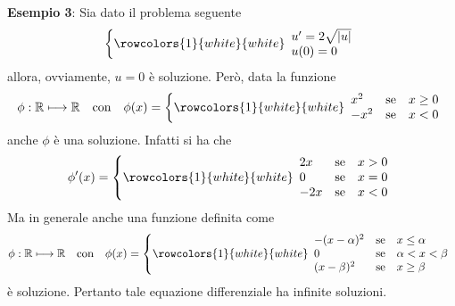 \documentclass[a4paper]{extarticle}
\begin{document}
\vspace{2em}
\noindent
\textbf{Esempio 3}: Sia dato il problema seguente
\[
    \left\{
        \rowcolors{1}{white}{white}
        \begin{array}{lll}
            u'=2\sqrt{\vert u \vert}\\
            u(0)=0
        \end{array}
    \right.
\]
allora, ovviamente, $u=0$ è soluzione. Però, data la funzione
\[\phi : \mathbb{R} \longmapsto \mathbb{R} \hspace{1em} \text{con} \hspace{1em} \phi(x)=\left\{
    \rowcolors{1}{white}{white}
    \begin{array}{lll}
        x^2  & \text{se} & x \geq 0\\
        -x^2 & \text{se} & x < 0\\
    \end{array}
\right.\]
anche $\phi$ è una soluzione. Infatti si ha che 
\[\phi'(x)=\left\{
    \rowcolors{1}{white}{white}
    \begin{array}{lll}
        2x  & \text{se} & x > 0\\
        0   & \text{se} & x = 0\\
        -2x & \text{se} & x < 0\\
    \end{array}
\right.\]
Ma in generale anche una funzione definita come
\[\phi : \mathbb{R} \longmapsto \mathbb{R} \hspace{1em} \text{con} \hspace{1em} \phi(x)=\left\{
    \rowcolors{1}{white}{white}
    \begin{array}{lll}
        -(x-\alpha)^2  & \text{se} & x \leq \alpha\\
        0              & \text{se} & \alpha < x < \beta\\
        (x-\beta)^2    & \text{se} & x \geq \beta\\
    \end{array}
\right.\]
è soluzione. Pertanto tale equazione differenziale ha infinite soluzioni.
\end{document}
